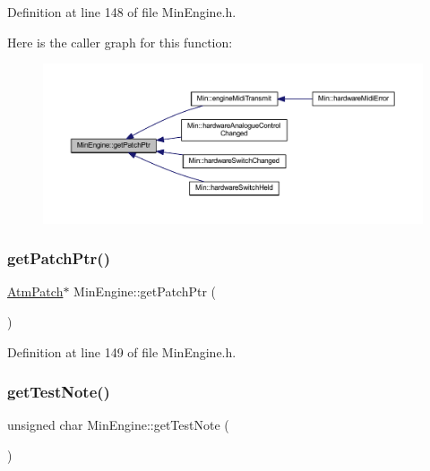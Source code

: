 Definition at line 148 of file Min\+Engine.\+h.

Here is the caller graph for this function\+:
\nopagebreak
\begin{figure}[H]
\begin{center}
\leavevmode
\includegraphics[width=350pt]{class_min_engine_a800de17fbe50c5f2aceab2999f3b8be1_icgraph}
\end{center}
\end{figure}
\mbox{\label{class_min_engine_ae8bf10e7e525b7474aa5b5f9a4aee7d9}} 
\subsubsection{\texorpdfstring{get\+Patch\+Ptr()}{getPatchPtr()}\hspace{0.1cm}{\footnotesize\ttfamily [2/2]}}
{\footnotesize\ttfamily \hyperlink{class_atm_patch}{Atm\+Patch}$\ast$ Min\+Engine\+::get\+Patch\+Ptr (\begin{DoxyParamCaption}{ }\end{DoxyParamCaption})\hspace{0.3cm}{\ttfamily [inline]}}



Definition at line 149 of file Min\+Engine.\+h.

\mbox{\label{class_min_engine_a461861aff0eb8271558c9c20bc040b56}} 
\subsubsection{\texorpdfstring{get\+Test\+Note()}{getTestNote()}}
{\footnotesize\ttfamily unsigned char Min\+Engine\+::get\+Test\+Note (\begin{DoxyParamCaption}{ }\end{DoxyParamCaption})\hspace{0.3cm}{\ttfamily [inline]}}



